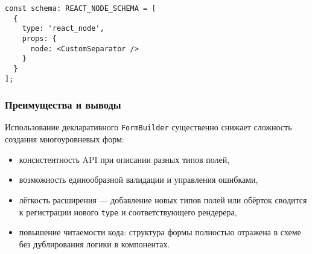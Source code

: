 \begin{lstlisting}[caption={Пример \texttt{REACT\_NODE\_SCHEMA}},label={lst:react-node-schema}]
const schema: REACT_NODE_SCHEMA = [
  {
    type: 'react_node',
    props: {
      node: <CustomSeparator />
    }
  }
];
\end{lstlisting}

\subsubsection{Преимущества и выводы}
Использование декларативного \texttt{FormBuilder} существенно снижает сложность создания многоуровневых форм:
\begin{itemize}
  \item консистентность API при описании разных типов полей,
  \item возможность единообразной валидации и управления ошибками,
  \item лёгкость расширения — добавление новых типов полей или обёрток сводится к регистрации нового \texttt{type} и соответствующего рендерера,
  \item повышение читаемости кода: структура формы полностью отражена в схеме без дублирования логики в компонентах.
\end{itemize}

